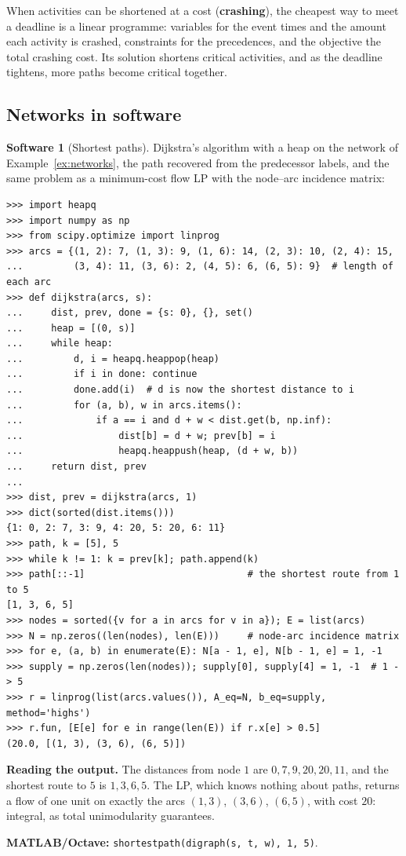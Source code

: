 \documentclass[11pt,a4paper]{article}
\numberwithin{equation}{section}
\theoremstyle{definition}
\newtheorem{software}[thm]{Software}
\begin{document}
When activities can be shortened at a cost (\textbf{crashing}), the cheapest way to meet a deadline is a linear programme: variables for the event times and the amount each activity is crashed, constraints for the precedences, and the objective the total crashing cost. Its solution shortens critical activities, and as the deadline tightens, more paths become
critical together.

\subsection{Networks in software}
\label{ssec:software8}

\begin{software}[Shortest paths]
\label{sw:paths}
Dijkstra's algorithm with a heap on the network of Example~\ref{ex:networks}, the path recovered from the predecessor labels, and the same problem as a minimum-cost flow LP with the node--arc incidence matrix:
{\small\begin{verbatim}
>>> import heapq
>>> import numpy as np
>>> from scipy.optimize import linprog
>>> arcs = {(1, 2): 7, (1, 3): 9, (1, 6): 14, (2, 3): 10, (2, 4): 15,
...         (3, 4): 11, (3, 6): 2, (4, 5): 6, (6, 5): 9}  # length of each arc
>>> def dijkstra(arcs, s):
...     dist, prev, done = {s: 0}, {}, set()
...     heap = [(0, s)]
...     while heap:
...         d, i = heapq.heappop(heap)
...         if i in done: continue
...         done.add(i)  # d is now the shortest distance to i
...         for (a, b), w in arcs.items():
...             if a == i and d + w < dist.get(b, np.inf):
...                 dist[b] = d + w; prev[b] = i
...                 heapq.heappush(heap, (d + w, b))
...     return dist, prev
...
>>> dist, prev = dijkstra(arcs, 1)
>>> dict(sorted(dist.items()))
{1: 0, 2: 7, 3: 9, 4: 20, 5: 20, 6: 11}
>>> path, k = [5], 5
>>> while k != 1: k = prev[k]; path.append(k)
>>> path[::-1]                             # the shortest route from 1 to 5
[1, 3, 6, 5]
>>> nodes = sorted({v for a in arcs for v in a}); E = list(arcs)
>>> N = np.zeros((len(nodes), len(E)))     # node-arc incidence matrix
>>> for e, (a, b) in enumerate(E): N[a - 1, e], N[b - 1, e] = 1, -1
>>> supply = np.zeros(len(nodes)); supply[0], supply[4] = 1, -1  # 1 -> 5
>>> r = linprog(list(arcs.values()), A_eq=N, b_eq=supply, method='highs')
>>> r.fun, [E[e] for e in range(len(E)) if r.x[e] > 0.5]
(20.0, [(1, 3), (3, 6), (6, 5)])
\end{verbatim}}
\textbf{Reading the output.} The distances from node $1$ are $0, 7, 9, 20, 20, 11$, and the shortest route to $5$ is $1, 3, 6, 5$. The LP, which knows nothing about paths, returns a flow of one unit on exactly the arcs $(1, 3)$, $(3, 6)$, $(6, 5)$, with cost $20$: integral, as total unimodularity guarantees.

\textbf{MATLAB/Octave:} \texttt{shortestpath(digraph(s, t, w), 1, 5)}.
\end{software}
\end{document}
